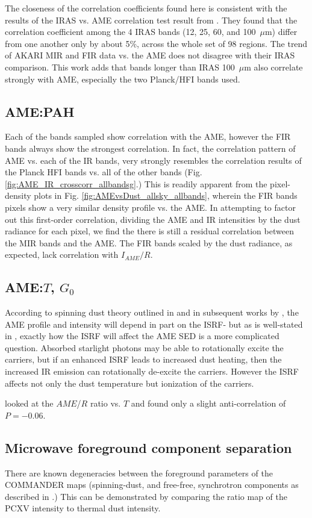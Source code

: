           The closeness of the correlation coefficients found here is consistent with the results of the IRAS vs. AME correlation test result from \cite{planckXV}. They found that the correlation coefficient among the 4 IRAS bands (12, 25, 60, and 100~$\mu$m) differ from one another only by about 5\%, across the whole set of 98 regions. The trend of AKARI MIR and FIR data vs. the AME does not disagree with their IRAS comparison. This work adds that bands longer than IRAS 100~$\mu$m also correlate strongly with AME, especially the two Planck/HFI bands used.

          \subsection{AME:PAH}
            Each of the bands sampled show correlation with the AME, however the FIR bands always show the strongest correlation. In fact, the correlation pattern of AME vs. each of the IR bands, very strongly resembles the correlation results of the Planck HFI bands vs. all of the other bands (Fig. \ref{fig:AME_IR_crosscorr_allbandsg}.) This is readily apparent from the pixel-density plots in Fig. \ref{fig:AMEvsDust_allsky_allbands}, wherein the FIR bands pixels show a very similar density profile vs. the AME. In attempting to factor out this first-order correlation, dividing the AME and IR intensities by the dust radiance for each pixel, we find the there is still a residual correlation between the MIR bands and the AME. The FIR bands scaled by the dust radiance, as expected, lack correlation with $I_{AME}/R$.

          \subsection{AME:$T$, $G_{0}$}
            According to spinning dust theory outlined in \cite{draine98a} and in subsequent works by \cite{ysard10a}, the AME profile and intensity will depend in part on the ISRF- but as is well-stated in \cite{hensley17a}, exactly how the ISRF will affect the AME SED is a more complicated question. Absorbed starlight photons may be able to rotationally excite the carriers, but if an enhanced ISRF leads to increased dust heating, then the increased IR emission can rotationally de-excite the carriers. However the ISRF affects not only the dust temperature but ionization of the carriers.

            \cite{hensley16} looked at the $AME$/$R$ ratio vs. $T$ and found only a slight anti-correlation of $P = -0.06$.

          \subsection{Microwave foreground component separation}

            There are known degeneracies between the foreground parameters of the COMMANDER maps (spinning-dust, and free-free, synchrotron components as described in \cite{planck15X}.) This can be demonstrated by comparing the ratio map of the PCXV intensity to thermal dust intensity.
